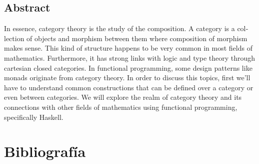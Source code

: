 \documentclass[12pt, twoside]{book}
\begin{document}
\section*{Abstract}
\begin{otherlanguage}{english}
    In essence, category theory is the study of the composition.
    A category is a collection of objects and morphism between them where composition of morphism makes sense.
    This kind of structure happens to be very common in most fields of mathematics.
    Furthermore, it has strong links with logic and type theory through cartesian closed categories.
    In functional programming, some design patterns like monads originate from category theory.
    In order to discuss this topics, first we'll have to understand common constructions that can be defined over a category or even between categories. 
    We will explore the realm of category theory and its connections with other fields of mathematics using functional programming, specifically Haskell.
\end{otherlanguage}










\backmatter

\chapter*{Bibliografía}
%
%
\end{document}
